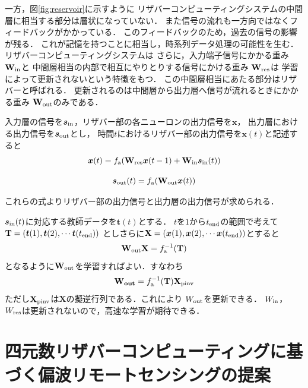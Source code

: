 \documentclass[uplatex,a4paper,10pt]{jsarticle}
\begin{document}
一方，図\ref{fig:reservoir}に示すように
リザバーコンピューティングシステムの中間層に相当する部分は層状になっていない．
また信号の流れも一方向ではなくフィードバックがかかっている．
このフィードバックのため，過去の信号の影響が残る．
これが記憶を持つことに相当し，時系列データ処理の可能性を生む．
リザバーコンピューティングシステムは
さらに，入力端子信号にかかる重み$\mathbf{W_{\rm{in}}}$と
中間層相当の内部で相互にやりとりする信号にかける重み
$\mathbf{W_{\rm{res}}}$は
学習によって更新されないという特徴をもつ．
この中間層相当にあたる部分はリザバーと呼ばれる．
更新されるのは中間層から出力層へ信号が流れるときにかかる重み
$\mathbf{W}_{\rm{out}}$のみである．

入力層の信号を$\bm{s}_{\rm{in}}$，リザバー部の各ニューロンの出力信号を$\bm{x}$，
出力層における出力信号を$\bm{s}_{\rm{out}}$とし，
時間$t$におけるリザバー部の出力信号を$\bm{x}(t)$と記述すると
\begin{equation}\label{equa:5}
    \bm{x}(t) = f_{\rm{a}}(\mathbf{W_{\rm{res}}} \bm{x}(t-1) + \mathbf{W}_{\rm{in}} \bm{s}_{\rm{in}}(t))
\end{equation}

\begin{equation}\label{equa:6}
    \bm{s}_{\rm{out}}(t) = f_{\rm{a}}(\mathbf{W}_{\rm{out}} \bm{x}(t))
\end{equation}

これらの式よりリザバー部の出力信号と出力層の出力信号が求められる．

$\bm{s}_{\rm{in}}(t)$に対応する教師データを$\bm{t}(t)$とする．
$t$を$1$から$t_{\rm{end}}$の範囲で考えて
$\mathbf{T}=(\bm{t}(1), \bm{t}(2), \cdots \bm{t}(t_{\rm{end}}))$
としさらに$\mathbf{X}=(\bm{x}(1), \bm{x}(2), \cdots \bm{x}(t_{\rm{end}}))$とすると
\begin{equation}\label{equa:7}
    \mathbf{W}_{\rm{out}} \mathbf{X} = f_{\rm{a}}^{-1}(\mathbf{T})
\end{equation}
となるように$\mathbf{W}_{\rm{out}}$を学習すればよい．すなわち
\begin{equation}\label{equa:8}
    \mathbf{W_{out}}=f_{\rm{a}}^{-1}(\mathbf{T}) \mathbf{X}_{\rm{pinv}}
\end{equation}
ただし$\mathbf{X}_{\rm{pinv}}$は$\mathbf{X}$の擬逆行列である．これにより
$W_{\rm{out}}$を更新できる．
$W_{\rm{in}}$，$W_{\rm{res}}$は更新されないので，高速な学習が期待できる．


\section{四元数リザバーコンピューティングに基づく偏波リモートセンシングの提案}
\end{document}
